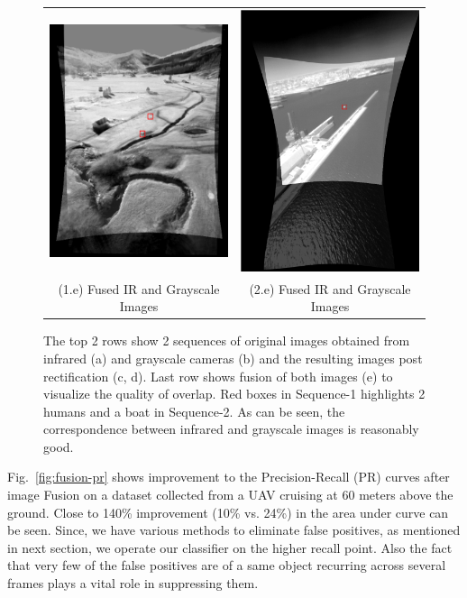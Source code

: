 \documentclass[runningheads]{llncs}
\begin{document}
\begin{figure}
  \begin{tabular}{cc}
  	\includegraphics[width=6cm]{img/fusion/Roth/Grayscale_and_Infrared_overlaid_Image_screenshot.png} &
  	\includegraphics[width=6cm]{img/fusion/Sea/3/Grayscale_and_Infrared_overlaid_Image_screenshot.png} \\
  	\small (1.e) Fused IR and Grayscale Images &
  	\small (2.e) Fused IR and Grayscale Images
  \end{tabular}

  \caption{The top 2 rows show 2 sequences of original images obtained from infrared (a) and grayscale cameras (b) and the resulting images post rectification (c, d). Last row shows fusion of both images (e) to visualize the quality of overlap. Red boxes in Sequence-1 highlights 2 humans and a boat in Sequence-2. As can be seen, the correspondence between infrared and grayscale images is reasonably good.}\label{fig:fusion}
\end{figure}

Fig.~\ref{fig:fusion-pr} shows improvement to the Precision-Recall (PR) curves after image Fusion on a dataset collected from a UAV cruising at 60 meters above the ground. Close to 140\% improvement (10\% vs. 24\%) in the area under curve can be seen. Since, we have various methods to eliminate false positives, as mentioned in next section, we operate our classifier on the higher recall point. Also the fact that very few of the false positives are of a same object recurring across several frames plays a vital role in suppressing them.
\end{document}
